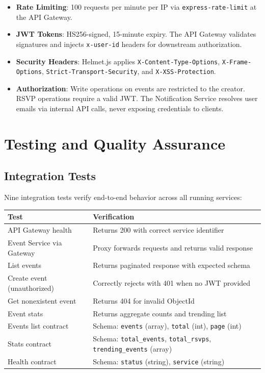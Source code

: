 \documentclass[12pt,a4paper]{article}
\begin{document}
\begin{itemize}
    \item \textbf{Rate Limiting}: 100 requests per minute per IP via \texttt{express-rate-limit} at the API Gateway.
    \item \textbf{JWT Tokens}: HS256-signed, 15-minute expiry. The API Gateway validates signatures and injects \texttt{x-user-id} headers for downstream authorization.
    \item \textbf{Security Headers}: Helmet.js applies \texttt{X-Content-Type-Options}, \texttt{X-Frame-Options}, \texttt{Strict-Transport-Security}, and \texttt{X-XSS-Protection}.
    \item \textbf{Authorization}: Write operations on events are restricted to the creator. RSVP operations require a valid JWT. The Notification Service resolves user emails via internal API calls, never exposing credentials to clients.
\end{itemize}

\newpage

\section{Testing and Quality Assurance}

\subsection{Integration Tests}

Nine integration tests verify end-to-end behavior across all running services:

\begin{longtable}{@{}p{5.5cm}p{8cm}@{}}
\toprule
\textbf{Test} & \textbf{Verification} \\
\midrule
API Gateway health & Returns 200 with correct service identifier \\
Event Service via Gateway & Proxy forwards requests and returns valid response \\
List events & Returns paginated response with expected schema \\
Create event (unauthorized) & Correctly rejects with 401 when no JWT provided \\
Get nonexistent event & Returns 404 for invalid ObjectId \\
Event stats & Returns aggregate counts and trending list \\
Events list contract & Schema: \texttt{events} (array), \texttt{total} (int), \texttt{page} (int) \\
Stats contract & Schema: \texttt{total\_events}, \texttt{total\_rsvps}, \texttt{trending\_events} (array) \\
Health contract & Schema: \texttt{status} (string), \texttt{service} (string) \\
\bottomrule
\end{longtable}
\end{document}
